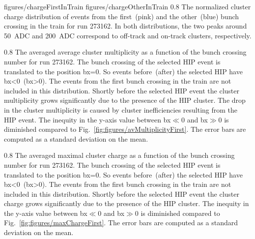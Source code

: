                  {figures/chargeFirstInTrain} %
                 {figures/chargeOtherInTrain} %
                 {0.8}       %
                 {The normalized cluster charge distribution of events from the first~(pink) and the other~(blue) bunch crossing in the train for run 273162. In both distributions, the two peaks around 50~ADC and 200~ADC correspond to off-track and on-track clusters, respectively. } %


                 {0.8}       %
                 {The averaged average cluster multiplicity as a function of the bunch crossing number for run 273162. The bunch crossing of the selected HIP event is translated to the position bx=0. So events before~(after) the selected HIP have bx<0~(bx>0). The events from the first bunch crossing in the train are not included in this distribution. Shortly before the selected HIP event the cluster multiplicity grows significantly due to the presence of the HIP cluster.  The drop in the cluster multiplicity is caused by cluster inefficiencies resulting from the HIP event. The inequity in the y-axis value between bx$\ll$0 and bx$\gg$0 is diminished compared to Fig.~\ref{fig:figures/avMultiplicityFirst}. The error bars are computed as a standard deviation on the mean. } %

                 {0.8}       %
                 {The averaged maximal cluster charge as a function of the bunch crossing number for run 273162. The bunch crossing of the selected HIP event is translated to the position bx=0. So events before~(after) the selected HIP have bx<0~(bx>0). The events from the first bunch crossing in the train are not included in this distribution. Shortly before the selected HIP event the cluster charge grows significantly due to the presence of the HIP cluster. The inequity in the y-axis value between bx$\ll$0 and bx$\gg$0 is diminished compared to Fig.~\ref{fig:figures/maxChargeFirst}. The error bars are computed as a standard deviation on the mean. } %

